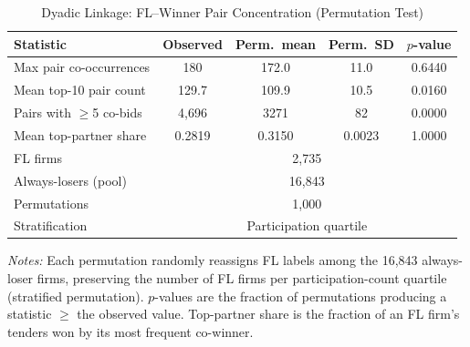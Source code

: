 \begin{table}[htbp]
\centering
\caption{Dyadic Linkage: FL--Winner Pair Concentration (Permutation Test)}
\label{tab:dyadic_permutation}
\begin{threeparttable}
\small
\begin{tabular}{lcccc}
\toprule
Statistic & Observed & Perm.\ mean & Perm.\ SD & $p$-value \\
\midrule
Max pair co-occurrences & 180 & 172.0 & 11.0 & 0.6440 \\
Mean top-10 pair count & 129.7 & 109.9 & 10.5 & 0.0160 \\
Pairs with $\geq$5 co-bids & 4,696 & 3271 & 82 & 0.0000 \\
Mean top-partner share & 0.2819 & 0.3150 & 0.0023 & 1.0000 \\
\midrule
FL firms & \multicolumn{4}{c}{2,735} \\
Always-losers (pool) & \multicolumn{4}{c}{16,843} \\
Permutations & \multicolumn{4}{c}{1,000} \\
Stratification & \multicolumn{4}{c}{Participation quartile} \\
\bottomrule
\end{tabular}
\begin{tablenotes}
\small
\item \textit{Notes:} Each permutation randomly reassigns FL labels among
the 16,843 always-loser firms, preserving the number of FL firms per
participation-count quartile (stratified permutation). $p$-values are the
fraction of permutations producing a statistic $\geq$ the observed value.
Top-partner share is the fraction of an FL firm's tenders won by its most
frequent co-winner.
\end{tablenotes}
\end{threeparttable}
\end{table}
